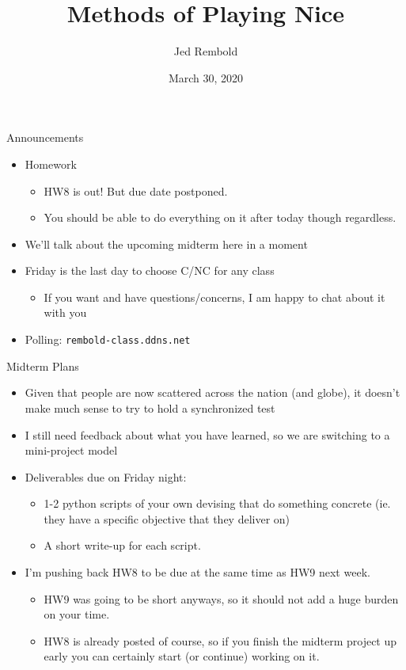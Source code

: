 \documentclass[pdf, aspectratio=169, 12pt]{beamer}
\title{Methods of Playing Nice}
\author{Jed Rembold}
\date{March 30, 2020}
\begin{document}
\begin{frame}{Announcements}
	\begin{itemize}
		\item Homework
			\begin{itemize}
				\item HW8 is out! But due date postponed.
				\item You should be able to do everything on it after today though regardless.
			\end{itemize}
		\item We'll talk about the upcoming midterm here in a moment
		\item Friday is the last day to choose C/NC for any class
			\begin{itemize}
				\item If you want and have questions/concerns, I am happy to chat about it with you
			\end{itemize}
		\item Polling: \nolinkurl{rembold-class.ddns.net}
	\end{itemize}
\end{frame}

\begin{frame}{Midterm Plans}
	\medskip
	\begin{itemize}
		\item Given that people are now scattered across the nation (and globe), it doesn't make much sense to try to hold a synchronized test
		\item I still need feedback about what you have learned, so we are switching to a mini-project model
		\item Deliverables due on Friday night:
			\begin{itemize}
				\item 1-2 python scripts of your own devising that do something concrete (ie. they have a specific objective that they deliver on)
				\item A short write-up for each script.
			\end{itemize}
		\item I'm pushing back HW8 to be due at the same time as HW9 next week.
			\begin{itemize}
				\item HW9 was going to be short anyways, so it should not add a huge burden on your time.
				\item HW8 is already posted of course, so if you finish the midterm project up early you can certainly start (or continue) working on it.
			\end{itemize}
			
	\end{itemize}
\end{frame}
\end{document}
